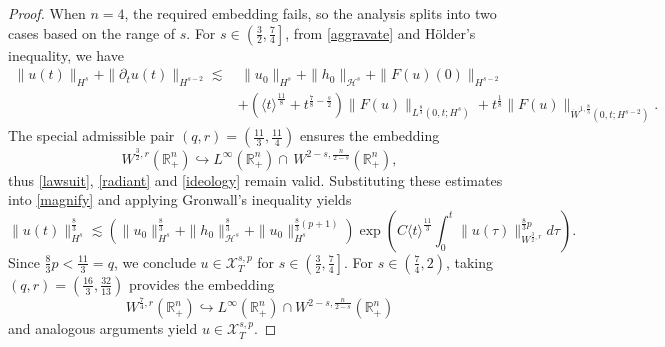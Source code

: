 \documentclass[preprint,compress,12pt]{elsarticle}
\numberwithin{equation}{section}
\begin{document}
\begin{proof}
	When $n=4$, the required embedding fails, so the analysis splits into two cases based on the range of $s$. For $s\in \left(\frac{3}{2},\frac{7}{4}\right]$, from \eqref{aggravate} and H\"{o}lder's inequality, we have
	\begin{equation}\label{magnify}
		\begin{aligned}
			\|u(t)\|_{H^{s}}+\|\partial_{t}u(t)\|_{H^{s-2}}\lesssim &\, \|u_{0}\|_{H^{s}}+\|h_{0}\|_{\mathcal{H}^{s}}+\|F(u)(0)\|_{H^{s-2}} \\ &+\left(\langle t\rangle^{\frac{11}{8}}+t^{\frac{7}{8}-\frac{s}{2}}\right) \|F(u)\|_{L^{\frac{8}{3}}(0,t;H^{s})}
			+t^{\frac{1}{8}}\|F(u)\|_{\dot{W}^{1,\frac{8}{3}}(0,t;H^{s-2})}.
		\end{aligned}	
	\end{equation}
	The special admissible pair $(q,r)=\left(\frac{11}{3},\frac{11}{4}\right)$ ensures the embedding $$W^{\frac{3}{2},r}(\mathbb{R}_{+}^{n})\hookrightarrow L^{\infty}(\mathbb{R}_{+}^{n})\cap \,W^{2-s,\frac{n}{2-s}}(\mathbb{R}_{+}^{n}),$$ thus \eqref{lawsuit}, \eqref{radiant} and \eqref{ideology} remain valid. Substituting these estimates into \eqref{magnify} and applying Gronwall's inequality yields
	\begin{equation*}
		\|u(t)\|_{H^{s}}^{\frac{8}{3}}\lesssim  \left(\|u_{0}\|_{H^{s}}^{\frac{8}{3}}+\|h_{0}\|_{\mathcal{H}^{s}}^{\frac{8}{3}}+\|u_{0}\|_{H^{s}}^{\frac{8}{3}(p+1)}\right) \exp\left(C\langle t\rangle ^{\frac{11}{3}}\int_{0}^{t} \|u(\tau)\|_{W^{\frac{3}{2},r}}^{\frac{8}{3}p} d\tau\right).
	\end{equation*}
	Since $\frac{8}{3}p<\frac{11}{3}=q$, we conclude $u\in\mathscr{X}^{s,p}_{T}$ for $s\in \left(\frac{3}{2},\frac{7}{4}\right]$. For $s\in \left(\frac{7}{4},2\right)$, taking $(q,r)=\left(\frac{16}{3},\frac{32}{13}\right)$ provides the embedding
	$$W^{\frac{7}{4},r}(\mathbb{R}_{+}^{n})\hookrightarrow L^{\infty}(\mathbb{R}_{+}^{n})\cap W^{2-s,\frac{n}{2-s}}(\mathbb{R}_{+}^{n})$$
	and analogous arguments yield $u\in\mathscr{X}^{s,p}_{T}$.
\end{proof}
\end{document}

